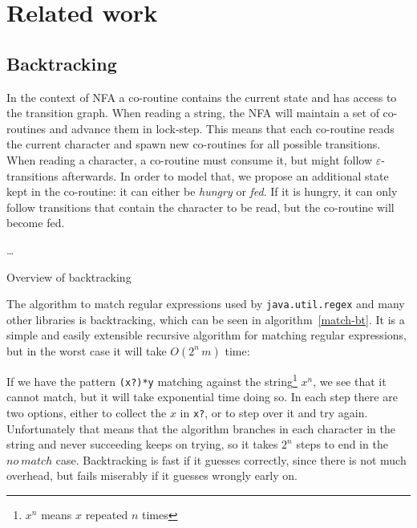 \documentclass[11pt]{Thesis}
\theoremstyle{definition}
\newcommand{\seclabel}[1]{\label{sec:#1}}
\begin{document}
\chapter{Related work}
\seclabel{related}
\section{Backtracking}

In the context of NFA a co-routine contains the 
current state and has access to the transition graph. When reading a 
string, the NFA will maintain a set of co-routines and advance them in 
lock-step. This means that each co-routine reads the current character and 
spawn new co-routines for all possible transitions. When reading a character, 
a co-routine must consume it, but might follow $\varepsilon$-transitions 
afterwards. In order to model that, we propose an additional state kept in 
the co-routine: it can either be \emph{hungry} or \emph{fed}. If it is 
hungry, it can only follow transitions that contain the character to be read, 
but the co-routine will become fed. 
\begin{algorithm*}
  \begin{algorithmic}
      \State {}
      \State {}
        \State {}
      \Else
        \State {}
      \EndIf
    \ElsIf{\dots}
      \State \dots
    \EndIf
  \EndFunction
  \end{algorithmic}
  \caption{\label{match-bt}Overview of backtracking}
\end{algorithm*}

The algorithm to match regular expressions used by \texttt{java.util.regex} 
and many other libraries is backtracking, which can be seen in
algorithm~\ref{match-bt}. It is a simple and easily extensible recursive 
algorithm for matching regular expressions, but in the worst case it will 
take $O(2^n\,m)$ time:

If we have the pattern \texttt{(x?)*y} matching against the string\footnote{
  $x^n$ means $x$ repeated $n$ times} $x^n$, we see that it
cannot match, but it will take exponential time doing so. In each step there
are two options, either to collect the $x$ in \texttt{x?}, or to step over it
and try again. Unfortunately that means that the algorithm branches in each
character in the string and never succeeding keeps on trying, so it takes $2^n$
steps to end in the $no\ match$ case.  Backtracking is fast if it guesses
correctly, since there is not much overhead, but fails miserably if it guesses
wrongly early on.
\end{document}
